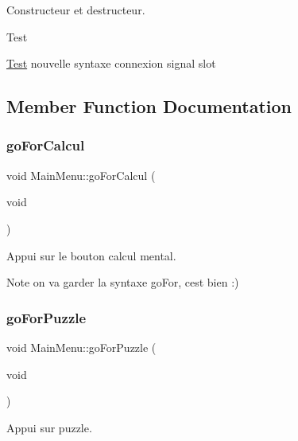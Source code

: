 Constructeur et destructeur. 

\begin{DoxyRefDesc}{Test}
\item[\hyperlink{test__test000001}{Test}]nouvelle syntaxe connexion signal slot \end{DoxyRefDesc}


\subsection{Member Function Documentation}
\mbox{\label{class_main_menu_aecda91a1fbea29f928cf2334d5c5b1f3}} 
\subsubsection{\texorpdfstring{go\+For\+Calcul}{goForCalcul}}
{\footnotesize\ttfamily void Main\+Menu\+::go\+For\+Calcul (\begin{DoxyParamCaption}\item[{void}]{ }\end{DoxyParamCaption})\hspace{0.3cm}{\ttfamily [slot]}}



Appui sur le bouton calcul mental. 

\begin{DoxyNote}{Note}
on va garder la syntaxe go\+For, c\textquotesingle{}est bien \+:) 
\end{DoxyNote}
\mbox{\label{class_main_menu_acacb97bab2a77bd09dedccea22a32116}} 
\subsubsection{\texorpdfstring{go\+For\+Puzzle}{goForPuzzle}}
{\footnotesize\ttfamily void Main\+Menu\+::go\+For\+Puzzle (\begin{DoxyParamCaption}\item[{void}]{ }\end{DoxyParamCaption})\hspace{0.3cm}{\ttfamily [slot]}}



Appui sur puzzle. 

